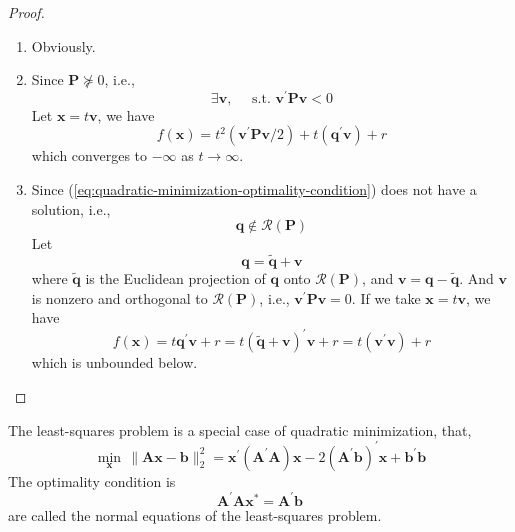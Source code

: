 \begin{proof}
    \hfill
    \begin{enumerate}
        \item
              Obviously.

        \item
              Since $\mathbf{P}\nsucceq 0$, i.e.,
              \begin{equation*}
                  \exists\mathbf{v},\quad\text{ s.t. }\mathbf{v}^{\prime}\mathbf{P}\mathbf{v}<0
              \end{equation*}
              Let $\mathbf{x}=t\mathbf{v}$, we have
              \begin{equation*}
                  f\left(\mathbf{x}\right)=t^{2}\left(\mathbf{v}^{\prime}\mathbf{P}\mathbf{v}/2\right)+t\left(\mathbf{q}^{\prime}\mathbf{v}\right)+r
              \end{equation*}
              which converges to $-\infty$ as $t\rightarrow\infty$.

        \item
              Since (\ref{eq:quadratic-minimization-optimality-condition}) does not have a solution, i.e.,
              \begin{equation*}
                  \mathbf{q}\notin\mathcal{R}(\mathbf{P})
              \end{equation*}
              Let
              \begin{equation*}
                  \mathbf{q}=\tilde{\mathbf{q}}+\mathbf{v}
              \end{equation*}
              where $\tilde{\mathbf{q}}$ is the Euclidean projection of $\mathbf{q}$ onto $\mathcal{R}(\mathbf{P})$, and $\mathbf{v}=\mathbf{q}-\tilde{\mathbf{q}}$. And $\mathbf{v}$ is nonzero and orthogonal to $\mathcal{R}(\mathbf{P})$, i.e., $\mathbf{v}^{\prime}\mathbf{P}\mathbf{v}=0$. If we take $\mathbf{x}=t\mathbf{v}$, we have
              \begin{equation*}
                  f(\mathbf{x})=t\mathbf{q}^{\prime}\mathbf{v}+r=t(\tilde{\mathbf{q}}+\mathbf{v})^{\prime}\mathbf{v}+r=t(\mathbf{v}^{\prime}\mathbf{v})+r
              \end{equation*}
              which is unbounded below.
    \end{enumerate}
\end{proof}

\begin{remark}
    The least-squares problem is a special case of quadratic minimization, that,
    \begin{equation*}
        \min_{\mathbf{x}}\,\|\mathbf{A}\mathbf{x}-\mathbf{b}\|_{2}^{2}=\mathbf{x}^{\prime}\left(\mathbf{A}^{\prime}\mathbf{A}\right)\mathbf{x}-2\left(\mathbf{A}^{\prime}\mathbf{b}\right)^{\prime}\mathbf{x}+\mathbf{b}^{\prime}\mathbf{b}
    \end{equation*}
    The optimality condition is
    \begin{equation*}
        \mathbf{A}^{\prime}\mathbf{A}\mathbf{x}^{*}=\mathbf{A}^{\prime}\mathbf{b}
    \end{equation*}
    are called the normal equations of the least-squares problem.
\end{remark}

